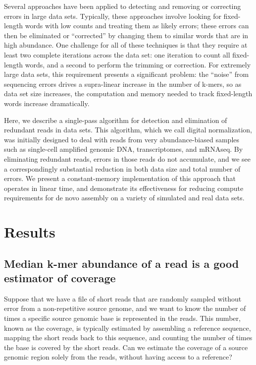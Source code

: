 \documentclass[10pt,draft]{article}
\begin{document}
Several approaches have been applied to detecting and removing or
correcting errors in large data sets.  Typically, these approaches
involve looking for fixed-length words with low counts and treating
them as likely errors; these errors can then be eliminated or
``corrected'' by changing them to similar words that are in high
abundance.  One challenge for all of these techniques is that they
require at least two complete iterations across the data set: one
iteration to count all fixed-length words, and a second to perform the
trimming or correction.  For extremely large data sets, this
requirement presents a significant problem: the ``noise'' from
sequencing errors drives a supra-linear increase in the number of
k-mers, so as data set size increases, the computation and memory
needed to track fixed-length words increase dramatically.

Here, we describe a single-pass algorithm for detection and
elimination of redundant reads in data sets.  This algorithm, which we
call digital normalization, was initially designed to deal with reads
from very abundance-biased samples such as single-cell amplified
genomic DNA, transcriptomes, and mRNAseq.  By eliminating redundant
reads, errors in those reads do not accumulate, and we see a
correspondingly substantial reduction in both data size and total
number of errors.  We present a constant-memory implementation of this
approach that operates in linear time, and demonstrate its
effectiveness for reducing compute requirements for de novo assembly
on a variety of simulated and real data sets.

\section*{Results}

\subsection*{Median k-mer abundance of a read is a good estimator of coverage}

Suppose that we have a file of short reads that are randomly sampled
without error from a non-repetitive source genome, and we want to know
the number of times a specific source genomic base is represented in
the reads.  This number, known as the coverage, is typically estimated
by assembling a reference sequence, mapping the short reads back to
this sequence, and counting the number of times the base is covered by
the short reads.  Can we estimate the coverage of a source genomic
region solely from the reads, without having access to a reference?
\end{document}
